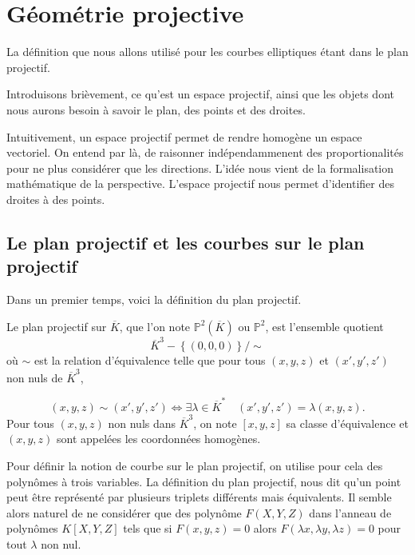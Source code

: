 \chapter{Géométrie projective}

La définition que nous allons utilisé pour les courbes elliptiques étant dans le plan
projectif.

Introduisons brièvement, ce qu'est un espace projectif, ainsi que les objets dont nous aurons
besoin à savoir le plan, des points et des droites.

Intuitivement, un espace projectif permet de rendre homogène un espace vectoriel. On entend
par là, de raisonner indépendammenent des proportionalités pour ne plus considérer que les
directions. L'idée nous vient de la formalisation mathématique de la perspective. 
L'espace projectif nous permet d'identifier des droites à des points.

\section{Le plan projectif et les courbes sur le plan projectif}

Dans un premier temps, voici la définition du plan projectif.

\begin{definition}
    \label{def:planP2}
    
    Le plan projectif sur $\overline{K}$, que l'on note $\mathbb{P}^2(\overline{K})$ ou
    $\mathbb{P}^2$, est l'ensemble quotient
    \[
    \overline{K}^3 - \left\{ (0,0,0) \right\} / \sim
    \] 
    où $\sim$ est la relation d'équivalence telle que pour tous $\left( x,y,z \right) $ et
    $\left( x',y',z'\right) $ non nuls de $\overline{K}^3$,

    \[
    \left( x,y,z \right) \sim \left( x',y',z' \right) \iff \exists \lambda \in
    \overline{K}^{*} \quad \left( x',y',z' \right) = \lambda \left( x,y,z \right) 
    .\] 
    Pour tous $\left( x,y,z \right) $ non nuls dans $\overline{K}^3$, on note $\left[
    x,y,z \right] $ sa classe d'équivalence et $(x,y,z)$ sont appelées les coordonnées homogènes.
\end{definition}

Pour définir la notion de courbe sur le plan projectif, on utilise pour cela des polynômes à
trois variables. La définition du plan projectif, nous dit qu'un point peut être représenté par
plusieurs triplets différents mais équivalents. Il semble alors naturel de ne considérer
que des polynôme $F(X,Y,Z)$ dans l'anneau de polynômes $K[X,Y,Z]$ tels que si $F(x,y,z) = 0$ alors $F(\lambda x, \lambda
y, \lambda z) = 0$ pour tout $\lambda$ non nul.


